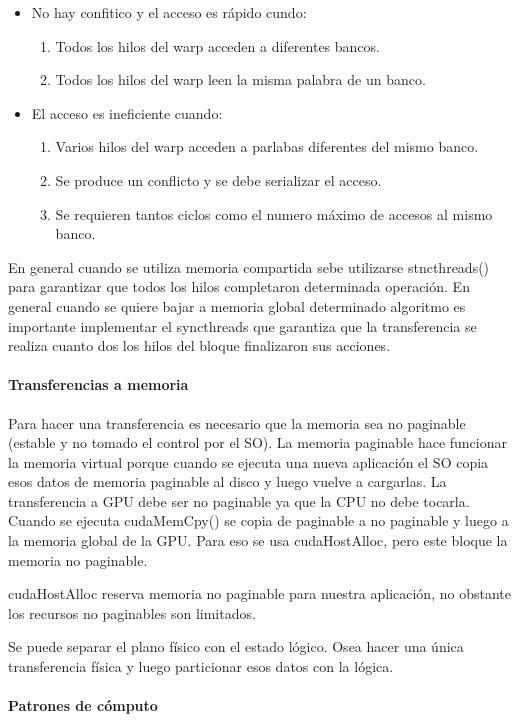 \documentclass[]{scrartcl}
\begin{document}
\begin{itemize}
	\item No hay confitico y el acceso es rápido cundo:
	\begin{enumerate}
		\item Todos los hilos del warp acceden a diferentes bancos.
		\item Todos los hilos del warp leen la misma palabra de un banco.
	\end{enumerate}
	\item El acceso es ineficiente cuando:
		\begin{enumerate}
		\item Varios hilos del warp acceden a parlabas diferentes del mismo banco.
		\item Se produce un conflicto y se debe serializar el acceso.
		\item Se requieren tantos ciclos como el numero máximo de accesos al mismo banco.
	\end{enumerate}
\end{itemize}
En general cuando se utiliza memoria compartida sebe utilizarse stncthreads() para garantizar que todos los hilos completaron determinada operación. En general cuando se quiere bajar a memoria global determinado algoritmo es importante implementar el syncthreads que garantiza que la transferencia se realiza cuanto dos los hilos del bloque finalizaron sus acciones. 
\paragraph{Transferencias a memoria}
Para hacer una transferencia es necesario que la memoria sea no paginable (estable y no tomado el control por el SO). La memoria paginable hace funcionar la memoria virtual porque cuando se ejecuta una nueva aplicación el SO copia esos datos de memoria paginable al disco y luego vuelve a cargarlas. La transferencia a GPU debe ser no paginable ya que la CPU no debe tocarla. Cuando se ejecuta cudaMemCpy() se copia de paginable a no paginable y luego a la memoria global de la GPU. Para eso se usa cudaHostAlloc, pero este bloque la memoria no paginable.

cudaHostAlloc reserva memoria no paginable para nuestra aplicación, no obstante los recursos no paginables son limitados. 

Se puede separar el plano físico con el estado lógico. Osea hacer una única transferencia física y luego particionar esos datos con la lógica. 

\paragraph{Patrones de cómputo}
\end{document}
